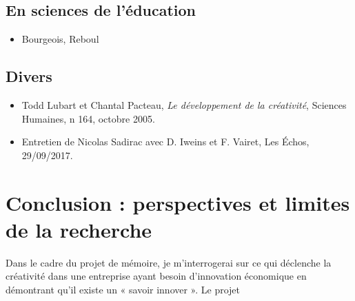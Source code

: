 \documentclass{article}
\begin{document}
\subsection{En sciences de l’éducation}

\begin{itemize}

\item Bourgeois, Reboul

\end{itemize}

\subsection{Divers}

\begin{itemize}

\item Todd Lubart et Chantal Pacteau, \textit{Le développement de la créativité}, Sciences Humaines, n 164, octobre 2005.
\item Entretien de Nicolas Sadirac avec D. Iweins et F. Vairet, Les Échos, 29/09/2017.

\end{itemize}

\section{Conclusion : perspectives et limites de la recherche}

Dans le cadre du projet de mémoire, je m'interrogerai sur ce qui déclenche la créativité dans une entreprise ayant besoin d'innovation économique en démontrant qu'il existe un « savoir innover ». Le projet   
\end{document}
